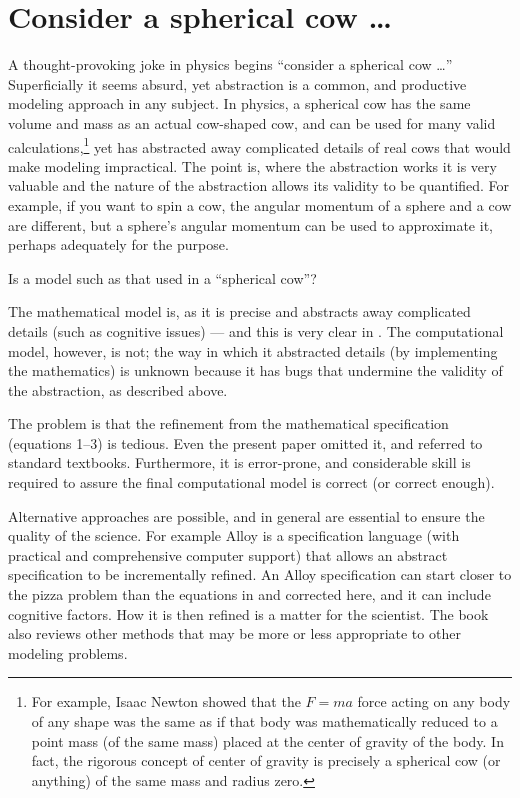 \documentclass[11pt]{article}
\begin{document}
\section{Consider a spherical cow \ldots}
A thought-provoking joke in physics begins ``consider a spherical cow \ldots'' Superficially it seems absurd, yet abstraction is a common, and productive modeling approach in any subject. In physics, a spherical cow has the same volume and mass as an actual cow-shaped cow, and can be used for many valid calculations,\footnote{For example, Isaac Newton showed that the $F=ma$ force acting on any body of any shape was the same as if that body was mathematically reduced to a point mass (of the same mass) placed at the center of gravity of the body. In fact, the rigorous concept of center of gravity is precisely a spherical cow (or anything) of the same mass and radius zero.} yet has abstracted away complicated details of real cows that would make modeling impractical. The point is, where the abstraction works it is very valuable and the nature of the abstraction allows its validity to be quantified. For example, if you want to spin a cow, the angular momentum of a sphere and a cow are different, but a sphere's angular momentum can be used to approximate it, perhaps adequately for the purpose.

Is a model such as that used in \cite{pizzap} a ``spherical cow''? 

The mathematical model is, as it is precise and abstracts away complicated details (such as cognitive issues) --- and this is very clear in \cite{pizzap}. The computational model, however, is not; the way in which it abstracted details (by implementing the mathematics) is unknown because it has bugs that undermine the validity of the abstraction, as described above.

The problem is that the refinement from the mathematical specification (equations 1--3) is tedious. Even the present paper omitted it, and referred to standard textbooks. Furthermore, it is error-prone, and considerable skill is required to assure the final computational model is correct (or correct enough).

Alternative approaches are possible, and in general are essential to ensure the quality of the science. For example Alloy \cite{alloy} is a specification language (with practical and comprehensive computer support) that allows an abstract specification to be incrementally refined. An Alloy specification can start closer to the pizza problem than the equations in \cite{pizzap} and corrected here, and it can include cognitive factors. How it is then refined is a matter for the scientist. The book \cite{alloy} also reviews other methods that may be more or less appropriate to other modeling problems.
\end{document}
